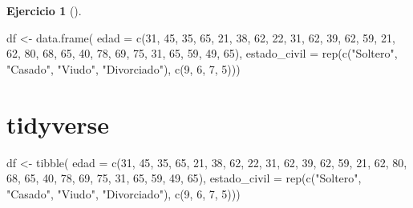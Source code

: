\documentclass[
  spanish,
  a4paper,
]{scrreport}
\newenvironment{Shaded}{\begin{snugshade}}{\end{snugshade}}
\newcommand{\AttributeTok}[1]{\textcolor[rgb]{0.40,0.45,0.13}{#1}}
\newcommand{\DecValTok}[1]{\textcolor[rgb]{0.68,0.00,0.00}{#1}}
\newcommand{\FunctionTok}[1]{\textcolor[rgb]{0.28,0.35,0.67}{#1}}
\newcommand{\NormalTok}[1]{\textcolor[rgb]{0.00,0.23,0.31}{#1}}
\newcommand{\OtherTok}[1]{\textcolor[rgb]{0.00,0.23,0.31}{#1}}
\newcommand{\StringTok}[1]{\textcolor[rgb]{0.13,0.47,0.30}{#1}}
\theoremstyle{definition}
\newtheorem{exercise}{Ejercicio}[chapter]
\theoremstyle{remark}
\begin{document}
\begin{exercise}[]
\begin{enumerate}
\begin{tcolorbox}
\begin{Shaded}
\begin{Highlighting}[]
\NormalTok{df }\OtherTok{\textless{}{-}} \FunctionTok{data.frame}\NormalTok{(}
    \AttributeTok{edad =} \FunctionTok{c}\NormalTok{(}\DecValTok{31}\NormalTok{, }\DecValTok{45}\NormalTok{, }\DecValTok{35}\NormalTok{, }\DecValTok{65}\NormalTok{, }\DecValTok{21}\NormalTok{, }\DecValTok{38}\NormalTok{, }\DecValTok{62}\NormalTok{, }\DecValTok{22}\NormalTok{, }\DecValTok{31}\NormalTok{, }\DecValTok{62}\NormalTok{, }\DecValTok{39}\NormalTok{, }\DecValTok{62}\NormalTok{, }\DecValTok{59}\NormalTok{, }\DecValTok{21}\NormalTok{, }\DecValTok{62}\NormalTok{, }\DecValTok{80}\NormalTok{, }\DecValTok{68}\NormalTok{, }\DecValTok{65}\NormalTok{, }\DecValTok{40}\NormalTok{, }\DecValTok{78}\NormalTok{, }\DecValTok{69}\NormalTok{, }\DecValTok{75}\NormalTok{, }\DecValTok{31}\NormalTok{, }\DecValTok{65}\NormalTok{, }\DecValTok{59}\NormalTok{, }\DecValTok{49}\NormalTok{, }\DecValTok{65}\NormalTok{), }
    \AttributeTok{estado\_civil =} \FunctionTok{rep}\NormalTok{(}\FunctionTok{c}\NormalTok{(}\StringTok{"Soltero"}\NormalTok{, }\StringTok{"Casado"}\NormalTok{, }\StringTok{"Viudo"}\NormalTok{, }\StringTok{"Divorciado"}\NormalTok{), }\FunctionTok{c}\NormalTok{(}\DecValTok{9}\NormalTok{, }\DecValTok{6}\NormalTok{, }\DecValTok{7}\NormalTok{, }\DecValTok{5}\NormalTok{)))}
\end{Highlighting}
\end{Shaded}

  \section{tidyverse}

\begin{Shaded}
\begin{Highlighting}[]
\NormalTok{df }\OtherTok{\textless{}{-}} \FunctionTok{tibble}\NormalTok{(}
    \AttributeTok{edad =} \FunctionTok{c}\NormalTok{(}\DecValTok{31}\NormalTok{, }\DecValTok{45}\NormalTok{, }\DecValTok{35}\NormalTok{, }\DecValTok{65}\NormalTok{, }\DecValTok{21}\NormalTok{, }\DecValTok{38}\NormalTok{, }\DecValTok{62}\NormalTok{, }\DecValTok{22}\NormalTok{, }\DecValTok{31}\NormalTok{, }\DecValTok{62}\NormalTok{, }\DecValTok{39}\NormalTok{, }\DecValTok{62}\NormalTok{, }\DecValTok{59}\NormalTok{, }\DecValTok{21}\NormalTok{, }\DecValTok{62}\NormalTok{, }\DecValTok{80}\NormalTok{, }\DecValTok{68}\NormalTok{, }\DecValTok{65}\NormalTok{, }\DecValTok{40}\NormalTok{, }\DecValTok{78}\NormalTok{, }\DecValTok{69}\NormalTok{, }\DecValTok{75}\NormalTok{, }\DecValTok{31}\NormalTok{, }\DecValTok{65}\NormalTok{, }\DecValTok{59}\NormalTok{, }\DecValTok{49}\NormalTok{, }\DecValTok{65}\NormalTok{), }
    \AttributeTok{estado\_civil =} \FunctionTok{rep}\NormalTok{(}\FunctionTok{c}\NormalTok{(}\StringTok{"Soltero"}\NormalTok{, }\StringTok{"Casado"}\NormalTok{, }\StringTok{"Viudo"}\NormalTok{, }\StringTok{"Divorciado"}\NormalTok{), }\FunctionTok{c}\NormalTok{(}\DecValTok{9}\NormalTok{, }\DecValTok{6}\NormalTok{, }\DecValTok{7}\NormalTok{, }\DecValTok{5}\NormalTok{)))}
\end{Highlighting}
\end{Shaded}


\end{tcolorbox}
\end{enumerate}
\end{exercise}
\end{document}
